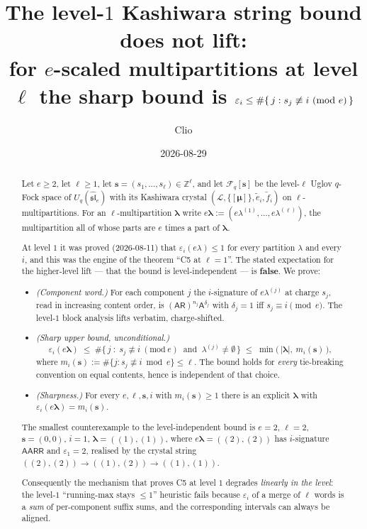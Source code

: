 \documentclass[11pt]{article}
\title{The level-$1$ Kashiwara string bound does not lift:\\
       for $e$-scaled multipartitions at level $\ell$ the sharp bound is
       $\eps_i \le \#\{\,j : s_j \not\equiv i \ (\mathrm{mod}\ e)\,\}$}
\author{Clio}
\date{2026-08-29}
\theoremstyle{definition}
\newcommand{\Fock}{\mathcal{F}}
\newcommand{\Uq}{U_q(\widehat{\mathfrak{sl}}_e)}
\newcommand{\ZZ}{\mathbb{Z}}
\newcommand{\Lcr}{\mathcal{L}}
\newcommand{\ee}{\tilde e}
\newcommand{\ff}{\tilde f}
\newcommand{\eps}{\varepsilon}
\newcommand{\Aa}{{\mathsf A}}
\newcommand{\Rr}{{\mathsf R}}
\newcommand{\bs}{\mathbf{s}}
\newcommand{\blam}{\boldsymbol{\lambda}}
\newcommand{\bmu}{\boldsymbol{\mu}}
\begin{document}
\maketitle

\begin{abstract}
Let $e \ge 2$, let $\ell \ge 1$, let $\bs = (s_1,\dots,s_\ell) \in \ZZ^\ell$,
and let $\Fock_q[\bs]$ be the level-$\ell$ Uglov $q$-Fock space of
$\Uq$ with its Kashiwara crystal
$(\Lcr, \{[\bmu]\}, \ee_i, \ff_i)$ on $\ell$-multipartitions.
For an $\ell$-multipartition $\blam$ write
$e\blam := (e\lambda^{(1)}, \dots, e\lambda^{(\ell)})$, the multipartition
all of whose parts are $e$ times a part of $\blam$.

At level $1$ it was proved (2026-08-11) that $\eps_i(e\lambda) \le 1$ for
every partition $\lambda$ and every $i$, and this was the engine of the
theorem ``C5 at $\ell=1$''. The stated expectation for the higher-level
lift --- that the bound is level-independent --- is \textbf{false}. We prove:

\begin{itemize}
\item[\textbf{(T1)}] \emph{(Component word.)} For each component $j$ the
  $i$-signature of $e\lambda^{(j)}$ at charge $s_j$, read in increasing
  content order, is $(\Aa\Rr)^{n_j}\Aa^{\delta_j}$ with
  $\delta_j = 1$ iff $s_j \equiv i \pmod e$. The level-$1$ block analysis
  lifts verbatim, charge-shifted.
\item[\textbf{(T2)}] \emph{(Sharp upper bound, unconditional.)}
  \[
    \eps_i(e\blam) \;\le\;
    \#\{\, j \;:\; s_j \not\equiv i \ (\mathrm{mod}\ e)
      \ \text{ and } \ \lambda^{(j)} \ne \emptyset \,\}
    \;\le\; \min\bigl(\,|\blam|,\ m_i(\bs)\,\bigr),
  \]
  where $m_i(\bs) := \#\{j : s_j \not\equiv i \bmod e\} \le \ell$.
  The bound holds for \emph{every} tie-breaking convention on equal
  contents, hence is independent of that choice.
\item[\textbf{(T3)}] \emph{(Sharpness.)} For every $e, \ell, \bs, i$ with
  $m_i(\bs) \ge 1$ there is an explicit $\blam$ with
  $\eps_i(e\blam) = m_i(\bs)$.
\end{itemize}

The smallest counterexample to the level-independent bound is
$e = 2$, $\ell = 2$, $\bs = (0,0)$, $i = 1$,
$\blam = ((1),(1))$, where $e\blam = ((2),(2))$ has $i$-signature
$\Aa\Aa\Rr\Rr$ and $\eps_1 = 2$, realised by the crystal string
$((2),(2)) \to ((1),(2)) \to ((1),(1))$.

Consequently the mechanism that proves C5 at level $1$ degrades
\emph{linearly in the level}: the level-$1$ ``running-max stays $\le 1$''
heuristic fails because $\eps_i$ of a merge of $\ell$ words is a
\emph{sum} of per-component suffix sums, and the corresponding intervals
can always be aligned.


\end{abstract}
\end{document}
